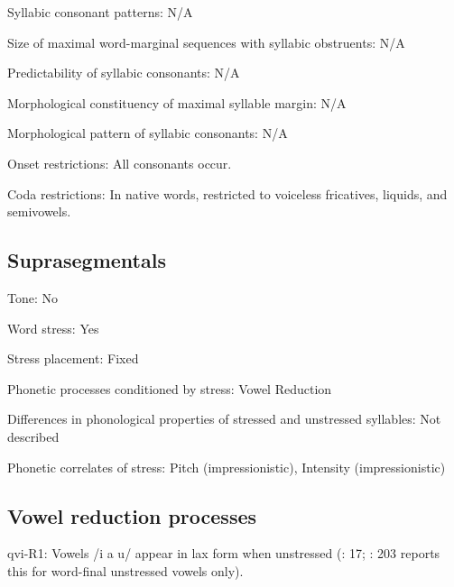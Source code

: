 {\begin{appendixdesc}
\item[Syllabic consonant patterns:] N/A

\item[Size of maximal word-marginal sequences with syllabic obstruents:] N/A

\item[Predictability of syllabic consonants:] N/A

\item[Morphological constituency of maximal syllable margin:] N/A

\item[Morphological pattern of syllabic consonants:] N/A

\item[Onset restrictions:] All consonants occur.

\item[Coda restrictions:] In native words, restricted to voiceless fricatives, liquids, and semivowels.
\end{appendixdesc}
\subsection*{Suprasegmentals}
\begin{appendixdesc}
\item[Tone:] No

\item[Word stress:] Yes

\item[Stress placement:] Fixed

\item[Phonetic processes conditioned by stress:] Vowel Reduction

\item[Differences in phonological properties of stressed and unstressed syllables:] Not described

\item[Phonetic correlates of stress:] Pitch (impressionistic), Intensity (impressionistic)
\end{appendixdesc}
\subsection*{Vowel reduction processes}
\begin{appendixdesc}

\item[qvi-R1:] Vowels /i a u/ appear in lax form when unstressed (\citealt{Jake1983}: 17; \citealt{Cole1982}: 203 reports this for word-final unstressed vowels only).
\end{appendixdesc}
}

